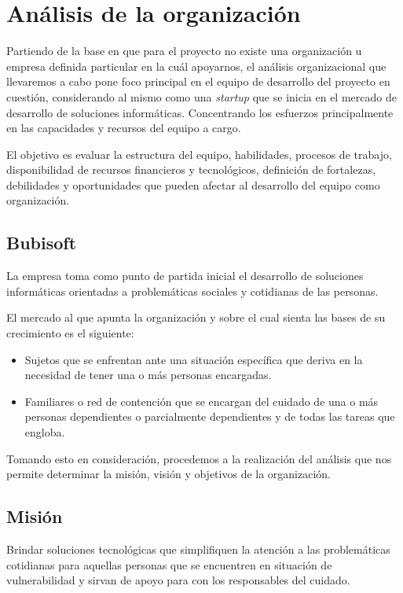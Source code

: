 \documentclass[a4paper,12pt]{article}
\begin{document}
    \newpage

    \tableofcontents 
    
    \newpage

    \section{Análisis de la organización}
    \par Partiendo de la base en que para el proyecto no existe una organización u empresa definida particular en la cuál apoyarnos, el análisis organizacional que llevaremos a cabo pone foco principal en el equipo de desarrollo del proyecto en cuestión, considerando al mismo como una \textit{startup} que se inicia en el mercado de desarrollo de soluciones informáticas. Concentrando los esfuerzos principalmente en las capacidades y recursos del equipo a cargo.
    \par El objetivo es evaluar la estructura del equipo, habilidades, procesos de trabajo, disponibilidad de recursos financieros y tecnológicos, definición de fortalezas, debilidades y oportunidades que pueden afectar al desarrollo del equipo como organización.
    \subsection{Bubisoft}
    \par La empresa toma como punto de partida inicial el desarrollo de soluciones informáticas orientadas a problemáticas sociales y cotidianas de las personas.
    \par El mercado al que apunta la organización y sobre el cual sienta las bases de su crecimiento es el siguiente:
    \begin{itemize}
        \item Sujetos que se enfrentan ante una situación específica que deriva en la necesidad de tener una o más personas encargadas.
        \item Familiares o red de contención que se encargan del cuidado de una o más personas dependientes o parcialmente dependientes y de todas las tareas que engloba.
    \end{itemize}
    \par Tomando esto en consideración, procedemos a la realización del análisis que nos permite determinar la misión, visión y objetivos de la organización.
    \subsection{Misión}
    \par Brindar soluciones tecnológicas que simplifiquen la atención a las problemáticas cotidianas para aquellas personas que se encuentren en situación de vulnerabilidad y sirvan de apoyo para con los responsables del cuidado.
\end{document}
